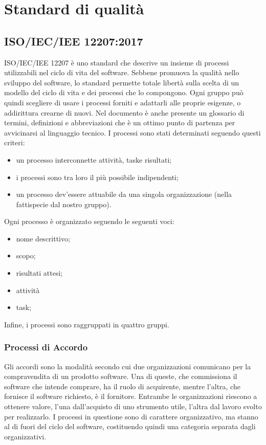 \appendix
\section{Standard di qualità}
	\subsection{ISO/IEC/IEE 12207:2017}
	ISO/IEC/IEE 12207 è uno standard che descrive un insieme di processi utilizzabili nel ciclo di vita del software. 
	Sebbene promuova la qualità nello sviluppo del software, lo standard permette totale libertà sulla scelta di un modello del ciclo di vita e dei processi che lo compongono. Ogni gruppo può quindi scegliere di usare i processi forniti e adattarli alle proprie esigenze, o addirittura crearne di nuovi.\newline 
	Nel documento è anche presente un glossario di termini, definizioni e abbreviazioni che è un ottimo punto di partenza per avvicinarsi al linguaggio tecnico.\newline 
	I processi sono stati determinati seguendo questi criteri:
	\begin{itemize}
		\item un processo interconnette attività, task\glosp e risultati;
		\item i processi sono tra loro il più possibile indipendenti;
		\item un processo dev'essere attuabile da una singola organizzazione (nella fattispecie dal nostro gruppo).
	\end{itemize}
	Ogni processo è organizzato seguendo le seguenti voci:
	\begin{itemize}
		\item nome descrittivo;
		\item scopo;
		\item risultati attesi;
		\item attività
		\item task;
	\end{itemize}
	Infine, i processi sono raggruppati in quattro gruppi.
		\subsubsection{Processi di Accordo}
		Gli accordi sono la modalità secondo cui due organizzazioni comunicano per la compravendita di un prodotto software. Una di queste, che commissiona il software che intende comprare, ha il ruolo di acquirente, mentre l'altra, che fornisce il software richiesto, è il fornitore. Entrambe le organizzazioni riescono a ottenere valore, l'una dall'acquisto di uno strumento utile, l'altra dal lavoro svolto per realizzarlo.
		I processi in questione sono di carattere organizzativo, ma stanno al di fuori del ciclo del software, costituendo quindi una categoria separata dagli organizzativi.

